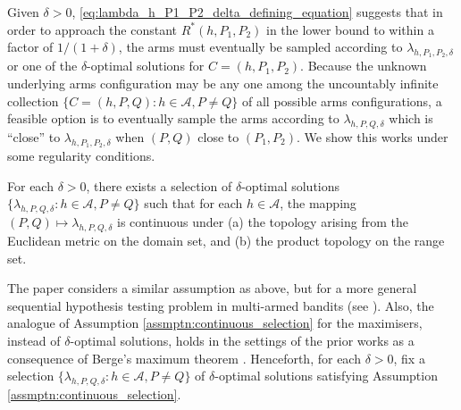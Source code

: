 Given $\delta>0$, \eqref{eq:lambda_h_P1_P2_delta_defining_equation} suggests that in order to approach the constant $R^*(h, P_1, P_2)$ in the lower bound to within a factor of $1/(1+\delta)$, the arms must eventually be sampled according to $\lambda_{h, P_1, P_2, \delta}$ or one of the $\delta$-optimal solutions for $C=(h, P_1, P_2)$. Because the unknown underlying arms configuration may be any one among the uncountably infinite collection $\{C=(h, P, Q):h\in \mathcal{A}, P\neq Q\}$ of all possible arms configurations, a feasible option is to eventually sample the arms according to $\lambda_{h, P, Q, \delta}$ which is ``close'' to $\lambda_{h, P_1, P_2, \delta}$ when $(P, Q)$ close to $(P_1, P_2)$. We show this works under some regularity conditions.
\begin{assumption}
\label{assmptn:continuous_selection}
For each $\delta>0$, there exists a selection of $\delta$-optimal solutions $\{\lambda_{h, P, Q, \delta}: h\in \mathcal{A}, P\neq Q\}$ such that for each $h\in \mathcal{A}$, the mapping $(P, Q) \mapsto \lambda_{h, P, Q, \delta}$ is continuous under (a) the topology arising from the Euclidean metric on the domain set, and (b) the product topology on the range set.
\end{assumption}

The paper \cite{prabhu2020sequential} considers a similar assumption as above, but for a more general sequential hypothesis testing problem in multi-armed bandits (see \cite[Assumption A]{prabhu2020sequential}). Also, the analogue of Assumption \ref{assmptn:continuous_selection} for the maximisers, instead of $\delta$-optimal solutions, holds in the settings of the prior works \cite{vaidhiyan2017learning, prabhu2017optimal} as a consequence of Berge's maximum theorem \cite{ausubel1993generalized}. Henceforth, for each $\delta>0$, fix a selection $\{\lambda_{h, P, Q, \delta}: h\in \mathcal{A}, P\neq Q\}$ of $\delta$-optimal solutions satisfying Assumption \ref{assmptn:continuous_selection}. 

